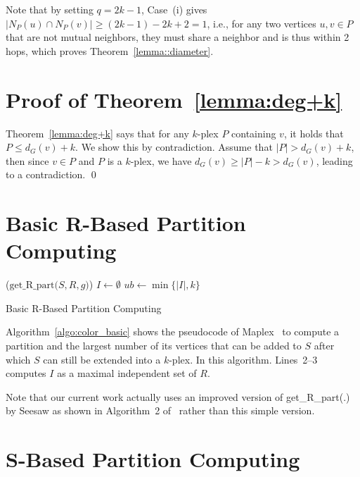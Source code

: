 \documentclass[sigconf, nonacm]{acmart}
\begin{document}
Note that by setting $q=2k-1$, Case~(i) gives $|N_P(u)\cap N_P(v)|\ge (2k-1)-2k+2=1$, i.e., for any two vertices $u,v\in P$ that are not mutual neighbors, they must share a neighbor and is thus within 2 hops, which proves Theorem~\ref{lemma::diameter}.

\section{Proof of Theorem~\ref{lemma:deg+k}}\label{appendix:deg+k}
Theorem~\ref{lemma:deg+k} says that for any $k$-plex $P$ containing $v$, it holds that $P\leq d_G(v)+k$. We show this by contradiction. Assume that $|P|>d_G(v)+k$, then since $v\in P$ and $P$ is a $k$-plex, we have $d_G(v)\geq |P|-k>d_G(v)$, leading to a contradiction. \qed

\section{Basic R-Based Partition Computing}\label{appendix:color_basic}

\begin{algorithm}[!t]
  \DontPrintSemicolon
  \Begin($\text{get\_R\_part}{(}S, R, g{)}$){
    $I\gets \emptyset$\;
    $ub\gets \min\{|I|, k\}$\;
  }
\caption{Basic R-Based Partition Computing}    
\label{algo:color_basic}
\end{algorithm}

Algorithm~\ref{algo:color_basic} shows the pseudocode of Maplex~\cite{Maplex} to compute a partition and the largest number of its vertices that can be added to $S$ after which $S$ can still be extended into a $k$-plex. In this algorithm. Lines~2--3 computes $I$ as a maximal independent set of $R$.

Note that our current work actually uses an improved version of get\_R\_part(.) by Seesaw as shown in Algorithm~2 of~\cite{seesaw} rather than this simple version.

\section{S-Based Partition Computing}\label{appendix:spart}
\end{document}
